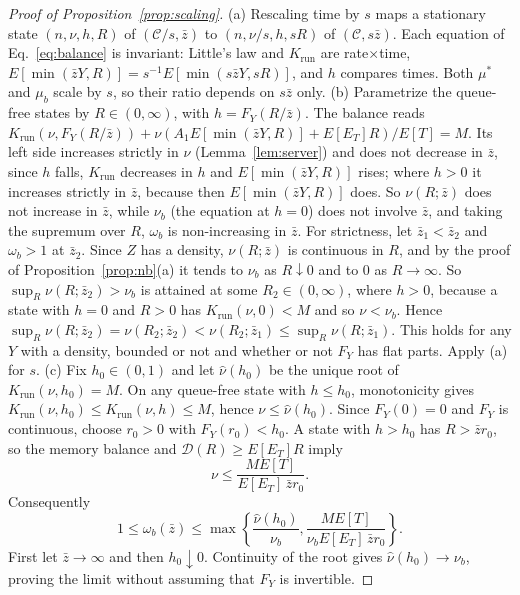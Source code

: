 \begin{proof}[Proof of Proposition~\ref{prop:scaling}]
(a) Rescaling time by $s$ maps a stationary state $(n,\nu,h,R)$ of $(\mathcal C/s,\bar z)$ to $(n,\nu/s,h,sR)$ of $(\mathcal C,s\bar z)$. Each equation of Eq.~\eqref{eq:balance} is invariant: Little's law and $K_{\mathrm{run}}$ are rate$\times$time, $E[\min(\bar zY,R)]=s^{-1}E[\min(s\bar zY,sR)]$, and $h$ compares times. Both $\mu^*$ and $\mu_b$ scale by $s$, so their ratio depends on $s\bar z$ only.
(b) Parametrize the queue-free states by $R\in(0,\infty)$, with $h=F_Y(R/\bar z)$. The balance reads $K_{\mathrm{run}}(\nu,F_Y(R/\bar z))+\nu(A_1E[\min(\bar zY,R)]+E[E_T]R)/E[T]=M$. Its left side increases strictly in $\nu$ (Lemma~\ref{lem:server}) and does not decrease in $\bar z$, since $h$ falls, $K_{\mathrm{run}}$ decreases in $h$ and $E[\min(\bar zY,R)]$ rises; where $h>0$ it increases strictly in $\bar z$, because then $E[\min(\bar zY,R)]$ does. So $\nu(R;\bar z)$ does not increase in $\bar z$, while $\nu_b$ (the equation at $h=0$) does not involve $\bar z$, and taking the supremum over $R$, $\omega_b$ is non-increasing in $\bar z$. For strictness, let $\bar z_1<\bar z_2$ and $\omega_b>1$ at $\bar z_2$. Since $Z$ has a density, $\nu(R;\bar z)$ is continuous in $R$, and by the proof of Proposition~\ref{prop:nb}(a) it tends to $\nu_b$ as $R\downarrow0$ and to 0 as $R\to\infty$. So $\sup_R\nu(R;\bar z_2)>\nu_b$ is attained at some $R_2\in(0,\infty)$, where $h>0$, because a state with $h=0$ and $R>0$ has $K_{\mathrm{run}}(\nu,0)<M$ and so $\nu<\nu_b$. Hence $\sup_R\nu(R;\bar z_2)=\nu(R_2;\bar z_2)<\nu(R_2;\bar z_1)\le\sup_R\nu(R;\bar z_1)$. This holds for any $Y$ with a density, bounded or not and whether or not $F_Y$ has flat parts. Apply (a) for $s$.
(c) Fix $h_0\in(0,1)$ and let $\widehat\nu(h_0)$ be the unique root of $K_{\mathrm{run}}(\nu,h_0)=M$. On any queue-free state with $h\le h_0$, monotonicity gives $K_{\mathrm{run}}(\nu,h_0)\le K_{\mathrm{run}}(\nu,h)\le M$, hence $\nu\le\widehat\nu(h_0)$. Since $F_Y(0)=0$ and $F_Y$ is continuous, choose $r_0>0$ with $F_Y(r_0)<h_0$. A state with $h>h_0$ has $R>\bar z r_0$, so the memory balance and $\mathcal D(R)\ge E[E_T]R$ imply
\[
\nu\le\frac{ME[T]}{E[E_T]\,\bar z r_0}.
\]
Consequently
\[
1\le\omega_b(\bar z)\le
\max\left\{\frac{\widehat\nu(h_0)}{\nu_b},
\frac{ME[T]}{\nu_b E[E_T]\,\bar z r_0}\right\}.
\]
First let $\bar z\to\infty$ and then $h_0\downarrow0$. Continuity of the root gives $\widehat\nu(h_0)\to\nu_b$, proving the limit without assuming that $F_Y$ is invertible.
\end{proof}

